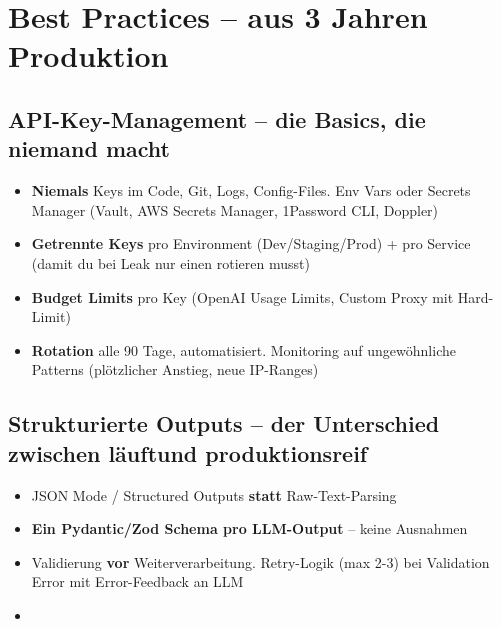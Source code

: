
\section{Best Practices -- aus 3 Jahren Produktion}

\subsection{API-Key-Management -- die Basics, die niemand macht}

\begin{itemize}[leftmargin=*]
    \item \textbf{Niemals} Keys im Code, Git, Logs, Config-Files. Env Vars oder Secrets Manager (Vault, AWS Secrets Manager, 1Password CLI, Doppler)
    \item \textbf{Getrennte Keys} pro Environment (Dev/Staging/Prod) + pro Service (damit du bei Leak nur einen rotieren musst)
    \item \textbf{Budget Limits} pro Key (OpenAI Usage Limits, Custom Proxy mit Hard-Limit)
    \item \textbf{Rotation} alle 90 Tage, automatisiert. Monitoring auf ungewöhnliche Patterns (plötzlicher Anstieg, neue IP-Ranges)
\end{itemize}

\subsection{Strukturierte Outputs -- der Unterschied zwischen \glqq läuft\grqq und \glqq produktionsreif\grqq}

\begin{itemize}[leftmargin=*]
    \item JSON Mode / Structured Outputs \textbf{statt} Raw-Text-Parsing
    \item \textbf{Ein Pydantic/Zod Schema pro LLM-Output} -- keine Ausnahmen
    \item Validierung \textbf{vor} Weiterverarbeitung. Retry-Logik (max 2-3) bei Validation Error mit Error-Feedback an LLM
    \item {}
\end{itemize}

